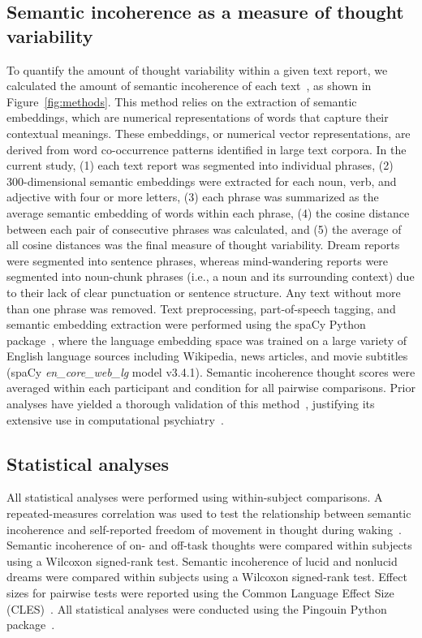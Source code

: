 \documentclass[10pt,a4paper,twocolumn]{article}
\begin{document}
\subsection*{Semantic incoherence as a measure of thought variability}
To quantify the amount of thought variability within a given text report, we calculated the amount of semantic incoherence of each text~\cite{bedi2015,elvevag2007}, as shown in Figure~\ref{fig:methods}. This method relies on the extraction of semantic embeddings, which are numerical representations of words that capture their contextual meanings. These embeddings, or numerical vector representations, are derived from word co-occurrence patterns identified in large text corpora. In the current study, (1) each text report was segmented into individual phrases, (2) 300-dimensional semantic embeddings were extracted for each noun, verb, and adjective with four or more letters, (3) each phrase was summarized as the average semantic embedding of words within each phrase, (4) the cosine distance between each pair of consecutive phrases was calculated, and (5) the average of all cosine distances was the final measure of thought variability. Dream reports were segmented into sentence phrases, whereas mind-wandering reports were segmented into noun-chunk phrases (i.e., a noun and its surrounding context) due to their lack of clear punctuation or sentence structure. Any text without more than one phrase was removed. Text preprocessing, part-of-speech tagging, and semantic embedding extraction were performed using the spaCy Python package~\cite{montani2023}, where the language embedding space was trained on a large variety of English language sources including Wikipedia, news articles, and movie subtitles (spaCy \textit{en\_core\_web\_lg} model v3.4.1). Semantic incoherence thought scores were averaged within each participant and condition for all pairwise comparisons. Prior analyses have yielded a thorough validation of this method~\cite{bedi2015,elvevag2007}, justifying its extensive use in computational psychiatry~\cite{corcoran2020a,deboer2018}.

\subsection*{Statistical analyses}
All statistical analyses were performed using within-subject comparisons. A repeated-measures correlation was used to test the relationship between semantic incoherence and self-reported freedom of movement in thought during waking~\cite{bakdash2017}. Semantic incoherence of on- and off-task thoughts were compared within subjects using a Wilcoxon signed-rank test. Semantic incoherence of lucid and nonlucid dreams were compared within subjects using a Wilcoxon signed-rank test. Effect sizes for pairwise tests were reported using the Common Language Effect Size (CLES)~\cite{vargha2000}. All statistical analyses were conducted using the Pingouin Python package~\cite{vallat2018}.
\end{document}
